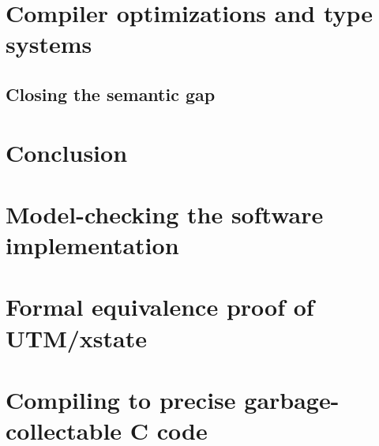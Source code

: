 \documentclass{phd-thesis}
\begin{document}
\chapter[Optimizations and type systems]{Compiler optimizations and type systems}
\section{Closing the semantic gap}\label{sec:safe-transactify}

\chapter{Conclusion}
\appendix
\chapter[Model-checking the implementation]{Model-checking the software implementation}


\chapter{Formal equivalence proof of UTM/xstate}\label{sec:hw-proof}

\chapter[Precise garbage-collectable C]{Compiling to precise garbage-collectable C code}

\backmatter

\printindex
\end{document}
